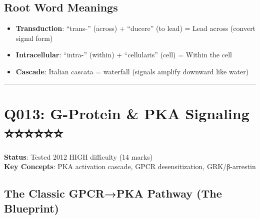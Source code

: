 \hypertarget{root-word-meanings}{%
\subsection{\texorpdfstring{\textbf{Root Word
Meanings}}{Root Word Meanings}}\label{root-word-meanings}}

\begin{itemize}
\tightlist
\item
  \textbf{Transduction}: ``trans-'' (across) + ``ducere'' (to lead) =
  Lead across (convert signal form)
\item
  \textbf{Intracellular}: ``intra-'' (within) + ``cellularis'' (cell) =
  Within the cell
\item
  \textbf{Cascade}: Italian cascata = waterfall (signals amplify
  downward like water)
\end{itemize}

\begin{center}\rule{0.5\linewidth}{0.5pt}\end{center}

\hypertarget{q013-g-protein-pka-signaling}{%
\section{Q013: G-Protein \& PKA Signaling
⭐⭐⭐⭐⭐⭐}\label{q013-g-protein-pka-signaling}}

\textbf{Status}: Tested 2012 \textbar{} HIGH difficulty (14 marks)\\
\textbf{Key Concepts}: PKA activation cascade, GPCR desensitization,
GRK/β-arrestin

\hypertarget{the-classic-gpcrpka-pathway-the-blueprint}{%
\subsection{\texorpdfstring{\textbf{The Classic GPCR→PKA Pathway (The
Blueprint)}}{The Classic GPCR→PKA Pathway (The Blueprint)}}\label{the-classic-gpcrpka-pathway-the-blueprint}}

\begin{Shaded}
\begin{Highlighting}[]
\end{Highlighting}
\end{Shaded}

